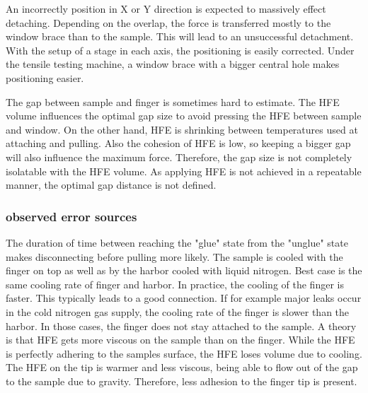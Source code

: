 An incorrectly position in X or Y direction is expected to massively effect detaching. Depending on the overlap, the force is transferred mostly to the window brace than to the sample. This will lead to an unsuccessful detachment. With the setup of a stage in each axis, the positioning is easily corrected. Under the tensile testing machine, a window brace with a bigger central hole makes positioning easier.

The gap between sample and finger is sometimes hard to estimate. The HFE volume influences the optimal gap size to avoid pressing the HFE between sample and window. On the other hand, HFE is shrinking between temperatures used at attaching and pulling. Also the cohesion of HFE is low, so keeping a bigger gap will also influence the maximum force. Therefore, the gap size is not completely isolatable with the HFE volume. As applying HFE is not achieved in a repeatable manner, the optimal gap distance is not defined.


\subsubsection{observed error sources}

The duration of time between reaching the "glue" state from the "unglue" state makes disconnecting before pulling more likely. The sample is cooled with the finger on top as well as by the harbor cooled with liquid nitrogen. Best case is the same cooling rate of finger and harbor. In practice, the cooling of the finger is faster. This typically leads to a good connection. If for example major leaks occur in the cold nitrogen gas supply, the cooling rate of the finger is slower than the harbor. In those cases, the finger does not stay attached to the sample. A theory is that HFE gets more viscous on the sample than on the finger. While the HFE is perfectly adhering to the samples surface, the HFE loses volume due to cooling. The HFE on the tip is warmer and less viscous, being able to flow out of the gap to the sample due to gravity. Therefore, less adhesion to the finger tip is present.


